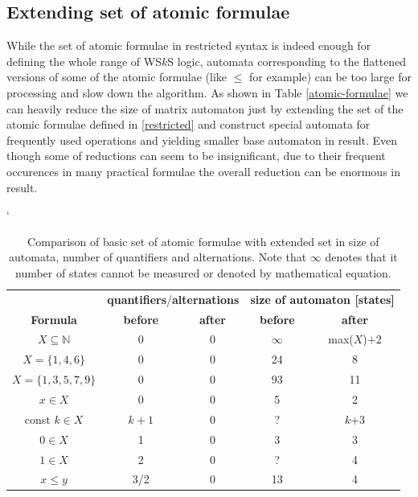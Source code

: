  \subsection{Extending set of atomic formulae}
 
 While the set of atomic formulae in restricted syntax is indeed enough for
 defining the whole range of WS$k$S logic, automata corresponding to the
 flattened versions of some of the atomic formulae (like $\leq$ for example) can
 be too large for processing and slow down the algorithm. As shown in Table
 \ref{atomic-formulae} we can heavily reduce the size of matrix automaton just
 by extending the set of the atomic formulae defined in \ref{restricted} and
 construct special automata for frequently used operations and yielding smaller
 base automaton in result. Even though some of reductions can seem to be
 insignificant, due to their frequent occurences in many practical formulae the
 overall reduction can be enormous in result.
 
 \begin{table}
  \catcode`
 \begin{center}
  \begin{tabular}{|c|c|c|c|c|}
  \hline  
                    &\multicolumn{2}{c|}{\textbf{quantifiers}/\textbf{alternations}}&\multicolumn{2}{c|}{\textbf{size
                    of automaton [states]}}\\
    \cline{2-5}
    \textbf{Formula} & \textbf{before}     &    \textbf{after}    &
    \textbf{before}     &    \textbf{after}\\
    \hline
    \hline
    $X \subseteq \mathbb{N}$ & 0 & 0 & $\infty$ & max($X$)$ + 2$\\
    \hline
    $X = \{1, 4, 6\}$ & 0 & 0 & 24 & 8\\
    \hline
    $X = \{1, 3, 5, 7, 9\}$ & 0 & 0 & 93 & 11\\
    \hline
    \hline
    $x \in X$ & 0 & 0 & 5 & 2\\
    \hline
    const $k \in X$ & $k+1$ & 0 & ? & $k$+3\\
    \hline
    $0 \in X$ & 1 & 0 & 3 & 3\\
    \hline
    $1 \in X$ & 2 & 0 & ? & 4\\
    \hline
    \hline
    $x \leq y$ & 3/2 & 0 & 13 & 4\\
    \hline
  \end{tabular}
 \end{center}
 \caption{Comparison of basic set of atomic formulae with extended set in size
 of automata, number of quantifiers and alternations. Note that $\infty$
 denotes that it number of states cannot be measured or denoted by mathematical
 equation.}
 \end{table}
 
